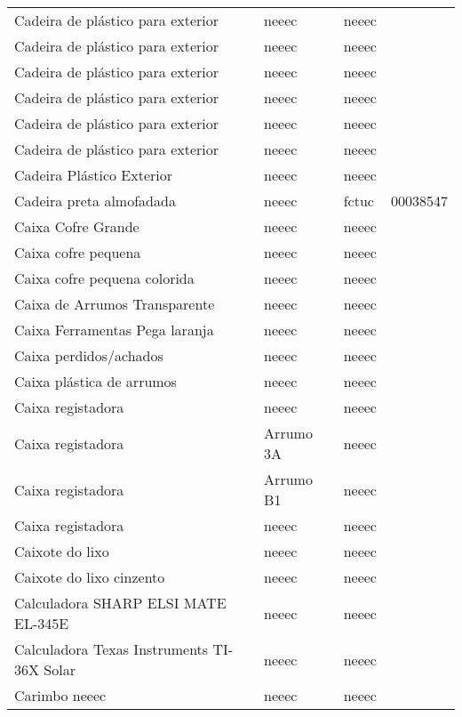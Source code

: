 \begin{longtable}{Xlll}
Cadeira de plástico para exterior & \acrshort{neeec} & \acrshort{neeec} & \\
Cadeira de plástico para exterior & \acrshort{neeec} & \acrshort{neeec} & \\
Cadeira de plástico para exterior & \acrshort{neeec} & \acrshort{neeec} & \\
Cadeira de plástico para exterior & \acrshort{neeec} & \acrshort{neeec} & \\
Cadeira de plástico para exterior & \acrshort{neeec} & \acrshort{neeec} & \\
Cadeira de plástico para exterior & \acrshort{neeec} & \acrshort{neeec} & \\
Cadeira Plástico Exterior & \acrshort{neeec} & \acrshort{neeec} & \\
Cadeira preta almofadada & \acrshort{neeec} & \acrshort{fctuc} & 00038547\\
Caixa Cofre Grande & \acrshort{neeec} & \acrshort{neeec} & \\
Caixa cofre pequena & \acrshort{neeec} & \acrshort{neeec} & \\
Caixa cofre pequena colorida & \acrshort{neeec} & \acrshort{neeec} & \\
Caixa de Arrumos Transparente & \acrshort{neeec} & \acrshort{neeec} & \\
Caixa Ferramentas Pega laranja & \acrshort{neeec} & \acrshort{neeec} & \\
Caixa perdidos/achados & \acrshort{neeec} & \acrshort{neeec} & \\
Caixa plástica de arrumos & \acrshort{neeec} & \acrshort{neeec} & \\
Caixa registadora & \acrshort{neeec} & \acrshort{neeec} & \\
Caixa registadora & Arrumo 3A & \acrshort{neeec} & \\
Caixa registadora & Arrumo B1 & \acrshort{neeec} & \\
Caixa registadora & \acrshort{neeec} & \acrshort{neeec} & \\
Caixote do lixo & \acrshort{neeec} & \acrshort{neeec} & \\
Caixote do lixo cinzento & \acrshort{neeec} & \acrshort{neeec} & \\
Calculadora SHARP ELSI MATE EL-345E & \acrshort{neeec} & \acrshort{neeec} & \\
Calculadora Texas Instruments TI-36X Solar & \acrshort{neeec} & \acrshort{neeec} & \\
Carimbo \acrshort{neeec} & \acrshort{neeec} & \acrshort{neeec} & \\

\end{longtable}
